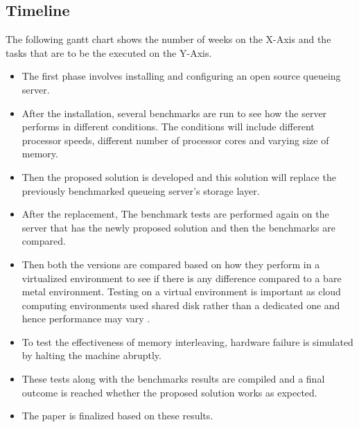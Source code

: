 \documentclass[12pt,a4paper]{article}
\begin{document}
 
  
 \subsection{Timeline}
 
 The following gantt chart shows the number of weeks on the X-Axis and the tasks that are to be the executed on the Y-Axis.
 
 \bigskip
 \bigskip
 
 \begin{gantt}{11}{12}
 \begin{ganttitle}
 \end{ganttitle}
 \end{gantt}

 \bigskip
 
\begin{itemize}
	\item The first phase involves installing and configuring an open source queueing server. 
	\item After the installation, several benchmarks are run to see how the server performs in different conditions. The conditions will include different processor speeds, different number of processor cores and varying size of memory. 
	\item Then the proposed solution is developed and this solution will replace the previously benchmarked queueing server's storage layer. 
	\item After the replacement, The benchmark tests are performed again on the server that has the newly proposed solution and then the benchmarks are compared. 
	\item Then both the versions are compared based on how they perform in a virtualized environment to see if there is any difference compared to a bare metal environment. Testing on a virtual environment is important as cloud computing environments used shared disk rather than a dedicated one and hence performance may vary \citep{liu2014performance}.
	 \item To test the effectiveness of memory interleaving, hardware failure is simulated by halting the machine abruptly. 
	\item These tests along with the benchmarks results are  compiled and a final outcome is reached whether the proposed solution works as expected.
	\item The paper is finalized based on these results.
\end{itemize}
\end{document}
